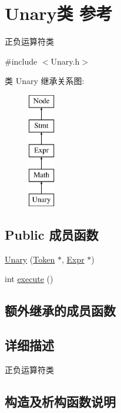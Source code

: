 \hypertarget{class_unary}{}\section{Unary类 参考}
\label{class_unary}


正负运算符类  




{\ttfamily \#include $<$Unary.\+h$>$}

类 Unary 继承关系图\+:\begin{figure}[H]
\begin{center}
\leavevmode
\includegraphics[height=5.000000cm]{class_unary}
\end{center}
\end{figure}
\subsection*{Public 成员函数}
\begin{DoxyCompactItemize}
\item 
\hyperlink{class_unary_ab8a81af2bbab768401579659ce929e53}{Unary} (\hyperlink{class_token}{Token} $\ast$, \hyperlink{class_expr}{Expr} $\ast$)
\item 
int \hyperlink{class_unary_af42edff1ee4718a9afeb7127e41af758}{execute} ()
\end{DoxyCompactItemize}
\subsection*{额外继承的成员函数}


\subsection{详细描述}
正负运算符类 

\subsection{构造及析构函数说明}
\mbox{\label{class_unary_ab8a81af2bbab768401579659ce929e53}} 
